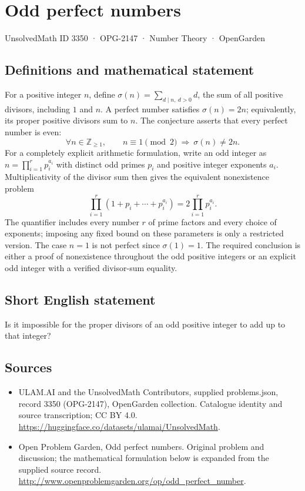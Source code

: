 \documentclass[11pt,a4paper]{article}
\begin{document}
\section*{Odd perfect numbers}\label{3350}
{\small UnsolvedMath ID 3350 · OPG-2147 · Number Theory · OpenGarden}
\subsection{Definitions and mathematical statement}
For a positive integer $n$, define
$\sigma(n)=\sum_{d\mid n,\ d>0}d$, the sum of all positive divisors,
including $1$ and $n$. A perfect number satisfies $\sigma(n)=2n$;
equivalently, its proper positive divisors sum to $n$. The conjecture
asserts that every perfect number is even:
\[
 \forall n\in\mathbb Z_{\ge1},\qquad
 n\equiv1\pmod2\ \Longrightarrow\ \sigma(n)\ne2n.
\]
For a completely explicit arithmetic formulation, write an odd integer
as $n=\prod_{i=1}^r p_i^{a_i}$ with distinct odd primes $p_i$ and
positive integer exponents $a_i$. Multiplicativity of the divisor sum
then gives the equivalent nonexistence problem
\[
 \prod_{i=1}^r(1+p_i+\cdots+p_i^{a_i})
       =2\prod_{i=1}^r p_i^{a_i}.
\]
The quantifier includes every number $r$ of prime factors and every
choice of exponents; imposing any fixed bound on these parameters is
only a restricted version. The case $n=1$ is not perfect since
$\sigma(1)=1$. The required conclusion is either a proof of
nonexistence throughout the odd positive integers or an explicit odd
integer with a verified divisor-sum equality.
\subsection{Short English statement}
Is it impossible for the proper divisors of an odd positive integer to add up to that integer?
\subsection{Sources}
\begin{itemize}
\item[S1] ULAM.AI and the UnsolvedMath Contributors, supplied problems.json, record 3350 (OPG-2147), OpenGarden collection. Catalogue identity and source transcription; CC BY 4.0.
\url{https://huggingface.co/datasets/ulamai/UnsolvedMath}.
\item[S2] Open Problem Garden, Odd perfect numbers. Original problem and discussion; the mathematical formulation below is expanded from the supplied source record.
\url{http://www.openproblemgarden.org/op/odd_perfect_number}.
\end{itemize}
\end{document}
